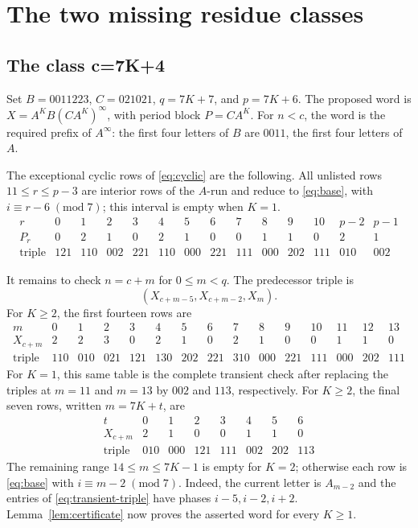 \documentclass[11pt]{article}
\begin{document}
\section{The two missing residue classes}

\subsection{The class c=7K+4}

Set $B=0011223$, $C=021021$, $q=7K+7$, and $p=7K+6$.
The proposed word is $X=A^KB(CA^K)^\infty$, with period block $P=CA^K$.
For $n<c$, the word is the required prefix of $A^\infty$: the first four
letters of $B$ are $0011$, the first four letters of $A$.

The exceptional cyclic rows of \eqref{eq:cyclic} are the following.
All unlisted rows $11\le r\le p-3$ are interior rows of the $A$-run and
reduce to \eqref{eq:base}, with $i\equiv r-6\;(\mathrm{mod}\;7)$; this interval is empty when $K=1$.
\[
\begin{array}{c|rrrrrrrrrrrrr}
r&0&1&2&3&4&5&6&7&8&9&10&p-2&p-1\\ \hline
P_r&0&2&1&0&2&1&0&0&1&1&0&2&1\\
\text{triple}&121&110&002&221&110&000&221&111&000&202&111&010&002
\end{array}
\]

It remains to check $n=c+m$ for $0\le m<q$.  The predecessor triple is
\begin{equation}\label{eq:transient-triple}
 (X_{c+m-5},X_{c+m-2},X_m).
\end{equation}
For $K\ge2$, the first fourteen rows are
\[
\begin{array}{c|rrrrrrrrrrrrrr}
m&0&1&2&3&4&5&6&7&8&9&10&11&12&13\\ \hline
X_{c+m}&2&2&3&0&2&1&0&2&1&0&0&1&1&0\\
\text{triple}&110&010&021&121&130&202&221&310&000&221&111&000&202&111
\end{array}
\]
For $K=1$, this same table is the complete transient check after replacing
the triples at $m=11$ and $m=13$ by $002$ and $113$, respectively.  For
$K\ge2$, the final seven rows, written $m=7K+t$, are
\[
\begin{array}{c|rrrrrrr}
t&0&1&2&3&4&5&6\\ \hline
X_{c+m}&2&1&0&0&1&1&0\\
\text{triple}&010&000&121&111&002&202&113
\end{array}
\]
The remaining range $14\le m\le7K-1$ is empty for $K=2$; otherwise each
row is \eqref{eq:base} with $i\equiv m-2\;(\mathrm{mod}\;7)$.  Indeed, the current letter is
$A_{m-2}$ and the entries of \eqref{eq:transient-triple} have phases
$i-5,i-2,i+2$.  Lemma~\ref{lem:certificate} now proves the asserted word
for every $K\ge1$.
\end{document}
